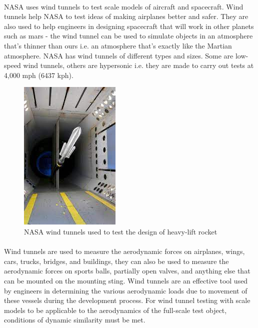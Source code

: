 \paragraph{}NASA uses wind tunnels to test scale models of aircraft and spacecraft. Wind tunnels help NASA to test ideas of making airplanes better and safer. They are also used to help engineers in designing spacecraft that will work in other planets such as mars - the wind tunnel can be used to simulate objects in an atmosphere that's thinner than ours i.e. an atmosphere that's exactly like the Martian atmosphere. NASA has wind tunnels of different types and sizes. Some are low-speed wind tunnels, others are hypersonic i.e. they are made to carry out tests at 4,000 mph (6437 kph).
\begin{center}
    \begin{figure}[!h]
\centering
\includegraphics{Figures/Fig4}
\caption{NASA wind tunnels used to test the design of heavy-lift rocket}
\end{figure}
\end{center}
\paragraph{}Wind tunnels are used to measure the aerodynamic forces on airplanes, wings, cars, trucks, bridges, and buildings, they can also be used to measure the
aerodynamic forces on sports balls, partially open valves, and anything else that can be mounted on the mounting sting. Wind tunnels are an effective tool used by engineers in determining the various aerodynamic loads due to movement of these vessels during the development process.
For wind tunnel testing with scale models to be applicable to the aerodynamics of the full-scale test object, conditions of dynamic similarity must be met.
